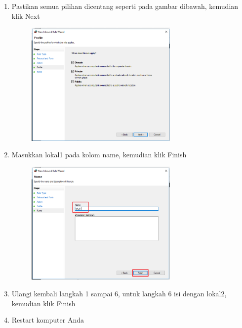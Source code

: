 \begin{enumerate}
	\item Pastikan semua pilihan dicentang seperti pada gambar dibawah, kemudian klik Next
		\begin{figure}[!htbp]
    		\centering
    		\includegraphics[width=0.7\textwidth]{figures/XAMPP/Xampp18.png}
    		\label{Xampp18}
		\end{figure}
		
	\item Masukkan lokal1 pada kolom name, kemudian klik Finish
		\begin{figure}[!htbp]
    		\centering
    		\includegraphics[width=0.7\textwidth]{figures/XAMPP/Xampp19.png}
    		\label{Xampp19}
		\end{figure}
		
	\item Ulangi kembali langkah 1 sampai 6, untuk langkah 6 isi dengan lokal2, kemudian klik Finish
	
	\item Restart komputer Anda 
\end{enumerate}
